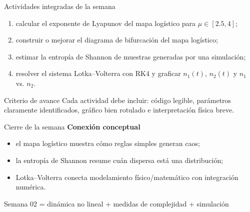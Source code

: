 \begin{frame}{Actividades integradas de la semana}
\begin{enumerate}
    \item calcular el exponente de Lyapunov del mapa logístico para $\mu\in[2.5,4]$;
    \item construir o mejorar el diagrama de bifurcación del mapa logístico;
    \item estimar la entropía de Shannon de muestras generadas por una simulación;
    \item resolver el sistema Lotka--Volterra con RK4 y graficar $n_1(t)$, $n_2(t)$ y $n_1$ vs. $n_2$.
\end{enumerate}

\vspace{0.2cm}
\begin{block}{Criterio de avance}
Cada actividad debe incluir: código legible, parámetros claramente identificados, gráfico bien rotulado e interpretación física breve.
\end{block}
\end{frame}

\begin{frame}{Cierre de la semana}
\textbf{Conexión conceptual}
\begin{itemize}
    \item el mapa logístico muestra cómo reglas simples generan caos;
    \item la entropía de Shannon resume cuán dispersa está una distribución;
    \item Lotka--Volterra conecta modelamiento físico/matemático con integración numérica.
\end{itemize}

\vspace{0.3cm}
\begin{center}
\Large{Semana 02 = dinámica no lineal + medidas de complejidad + simulación}
\end{center}
\end{frame}


